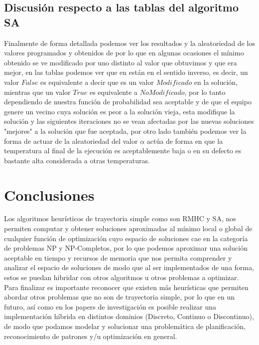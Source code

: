 \documentclass[10pt]{article}
\begin{document}
\subsection{Discusión respecto a las tablas del algoritmo SA}
Finalmente de forma detallada podemos ver los resultados y la aleatoriedad de los valores programados y obtenidos de por lo que en algunas ocasiones el mínimo obtenido se ve modificado por uno distinto al valor que obtuvimos y que era mejor, en las tablas podemos ver que en están en el sentido inverso, es decir, un valor $False$ es equivalente a decir que es un valor $Modificado$ en la solución, mientras que un valor $True$ es equivalente a $No Modificado$, por lo tanto dependiendo de nuestra función de probabilidad sea aceptable y de que el equipo genere un vecino cuya solución es peor a la solución vieja, esta modifique la solución y las siguientes iteraciones no se vean afectadas por las nuevas soluciones "mejores" a la solución que fue aceptada, por otro lado también podemos ver la forma de actuar de la aleatoriedad del valor $\alpha$ actúa de forma en que la temperatura al final de la ejecución es aceptablemente baja o en su defecto es bastante alta considerada a otras temperaturas.
\section{Conclusiones}
Los algoritmos heurísticos de trayectoria simple como son RMHC y SA, nos permiten computar y obtener soluciones aproximadas al mínimo local o global de cualquier función de optimización cuyo espacio de soluciones cae en la categoría de problemas NP y NP-Completos, por lo que podemos aproximar una solución aceptable en tiempo y recursos de memoria que nos permita comprender y analizar el espacio de soluciones de modo que al ser implementados de una forma, estos se puedan hibridar con otros algoritmos u otros problemas a optimizar.
\\
Para finalizar es importante reconocer que existen más heurísticas que permiten abordar otros problemas que no son de trayectoria simple, por lo que en un futuro, así como en los papers de investigación es posible realizar una implementación híbrida en distintos dominios (Discreto, Continuo o Discontinuo), de modo que podamos modelar y solucionar una problemática de planificación, reconocimiento de patrones y/u optimización en general.
\end{document}
